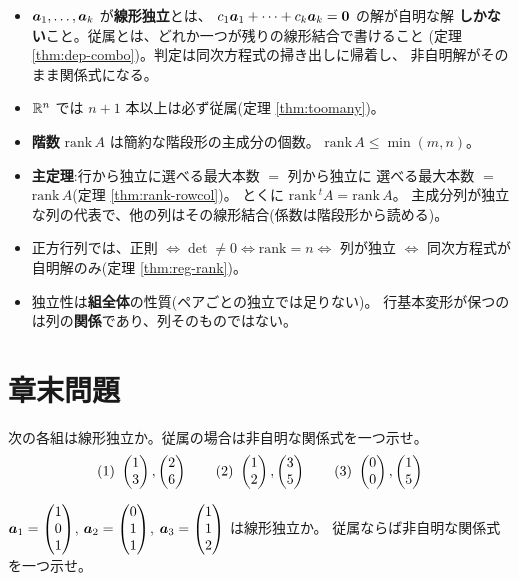 \begin{matome}
\begin{itemize}
\item $\bm{a}_1, \dots, \bm{a}_k$ が\textbf{線形独立}とは、
$c_1\bm{a}_1 + \cdots + c_k\bm{a}_k = \bm{0}$ の解が自明な解
\textbf{しかない}こと。従属とは、どれか一つが残りの線形結合で書けること
(定理 \ref{thm:dep-combo})。判定は同次方程式の掃き出しに帰着し、
非自明解がそのまま関係式になる。
\item $\mathbb{R}^n$ では $n + 1$ 本以上は必ず従属(定理 \ref{thm:toomany})。
\item \textbf{階数} $\mathrm{rank}\,A$ は簡約な階段形の主成分の個数。
$\mathrm{rank}\,A \le \min(m, n)$。
\item \textbf{主定理}:行から独立に選べる最大本数 $=$ 列から独立に
選べる最大本数 $=$ $\mathrm{rank}\,A$(定理 \ref{thm:rank-rowcol})。
とくに $\mathrm{rank}\,{}^t\!A = \mathrm{rank}\,A$。
主成分列が独立な列の代表で、他の列はその線形結合(係数は階段形から読める)。
\item 正方行列では、正則 $\iff \det \neq 0 \iff \mathrm{rank} = n
\iff$ 列が独立 $\iff$ 同次方程式が自明解のみ(定理 \ref{thm:reg-rank})。
\item 独立性は\textbf{組全体}の性質(ペアごとの独立では足りない)。
行基本変形が保つのは列の\textbf{関係}であり、列そのものではない。
\end{itemize}
\end{matome}

\section*{章末問題}

\begin{mondai}[基本]\label{q:rank-ex1}
次の各組は線形独立か。従属の場合は非自明な関係式を一つ示せ。
\[
(1)\ \begin{pmatrix}1 \\ 3\end{pmatrix}, \begin{pmatrix}2 \\ 6\end{pmatrix} \qquad
(2)\ \begin{pmatrix}1 \\ 2\end{pmatrix}, \begin{pmatrix}3 \\ 5\end{pmatrix} \qquad
(3)\ \begin{pmatrix}0 \\ 0\end{pmatrix}, \begin{pmatrix}1 \\ 5\end{pmatrix}
\]
\end{mondai}

\begin{mondai}[基本]\label{q:rank-ex2}
$\bm{a}_1 = \begin{pmatrix}1 \\ 0 \\ 1\end{pmatrix}$, $\bm{a}_2 = \begin{pmatrix}0 \\ 1 \\ 1\end{pmatrix}$,
$\bm{a}_3 = \begin{pmatrix}1 \\ 1 \\ 2\end{pmatrix}$ は線形独立か。
従属ならば非自明な関係式を一つ示せ。
\end{mondai}


